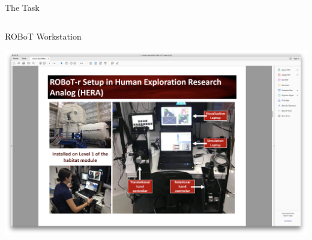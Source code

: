\documentclass[10pt]{beamer}
\begin{document}
\begin{frame}[fragile]{The Task}
\begin{columns}[T]
\begin{column}{\textwidth}
    \end{column}
  \end{columns}
\end{frame}

\begin{frame}[fragile]{ROBoT Workstation}
  \begin{center}
    \includegraphics[trim={13cm 5cm 22cm 15.5cm},clip,width=\linewidth]{../img/Screen_Shot_2018-07-26_at_1.43.16_PM.png}
  \end{center}
\end{frame}
\end{document}
